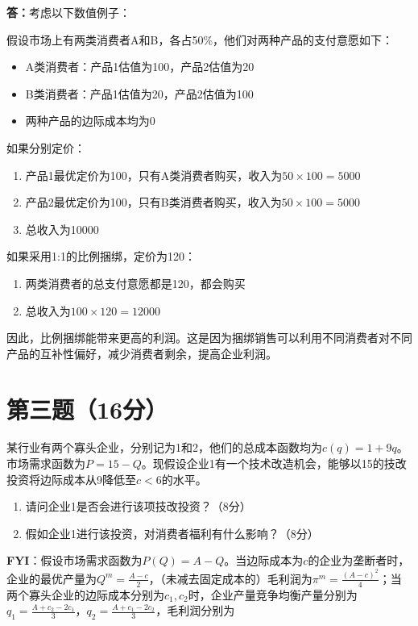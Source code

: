 \documentclass[12pt]{article}
\begin{document}
\noindent\textbf{答：}考虑以下数值例子：

假设市场上有两类消费者A和B，各占50\%，他们对两种产品的支付意愿如下：
\begin{itemize}
\item A类消费者：产品1估值为100，产品2估值为20
\item B类消费者：产品1估值为20，产品2估值为100
\item 两种产品的边际成本均为0
\end{itemize}

如果分别定价：
\begin{enumerate}
\item 产品1最优定价为100，只有A类消费者购买，收入为$50\times100=5000$
\item 产品2最优定价为100，只有B类消费者购买，收入为$50\times100=5000$
\item 总收入为10000
\end{enumerate}

如果采用1:1的比例捆绑，定价为120：
\begin{enumerate}
    
\item 两类消费者的总支付意愿都是120，都会购买
\item 总收入为$100\times120=12000$
\end{enumerate}

因此，比例捆绑能带来更高的利润。这是因为捆绑销售可以利用不同消费者对不同产品的互补性偏好，减少消费者剩余，提高企业利润。

\section*{第三题（16分）}
某行业有两个寡头企业，分别记为1和2，他们的总成本函数均为$c(q)=1+9q$。市场需求函数为$P=15-Q$。现假设企业1有一个技术改造机会，能够以15的技改投资将边际成本从9降低至$c<6$的水平。

\begin{enumerate}
\item 请问企业1是否会进行该项技改投资？（8分）
\item 假如企业1进行该投资，对消费者福利有什么影响？（8分）
\end{enumerate}

\noindent\textbf{FYI}：假设市场需求函数为$P(Q)=A-Q$。当边际成本为$c$的企业为垄断者时，企业的最优产量为$Q^m=\frac{A-c}{2}$，（未减去固定成本的）毛利润为$\pi^m=\frac{(A-c)^2}{4}$；当两个寡头企业的边际成本分别为$c_1,c_2$时，企业产量竞争均衡产量分别为$q_1=\frac{A+c_2-2c_1}{3}$，$q_2=\frac{A+c_1-2c_2}{3}$，毛利润分别为
\end{document}
